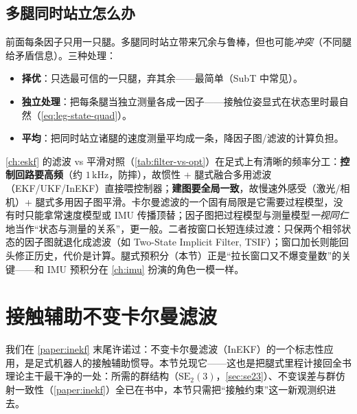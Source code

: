 \subsection{多腿同时站立怎么办}
\label{subsec:leg-multi}

前面每条因子只用一只腿。多腿同时站立带来冗余与鲁棒，但也可能\emph{冲突}（不同腿给矛盾信息）。三种处理：
\begin{itemize}
  \item \textbf{择优}：只选最可信的一只腿，弃其余\cite{carlone2026handbook}——最简单（SubT 中常见）。
  \item \textbf{独立处理}：把每条腿当独立测量各成一因子——接触位姿显式在状态里时最自然（\cref{eq:leg-state-quad}）。
  \item \textbf{平均}：把同时站立诸腿的速度测量平均成一条，降因子图/滤波的计算负担\cite{wisth2023vilens}。
\end{itemize}

\begin{insight}[滤波 vs 平滑：足式估计的频率分工]\label{ins:leg-filter-vs-smooth}
\cref{ch:eskf} 的滤波 vs 平滑对照（\cref{tab:filter-vs-opt}）在足式上有清晰的频率分工：\textbf{控制回路要高频}（约 $1\,\mathrm{kHz}$，防摔），故惯性 + 腿式融合多用滤波（EKF/UKF/InEKF）直接喂控制器；\textbf{建图要全局一致}，故慢速外感受（激光/相机）+ 腿式多用因子图平滑。卡尔曼滤波的一个固有局限是它需要过程模型，没有时只能拿常速度模型或 IMU 传播顶替；因子图把过程模型与测量模型\emph{一视同仁}地当作“状态与测量的关系”，更一般。二者按窗口长短连续过渡：只保两个相邻状态的因子图就退化成滤波（如 Two-State Implicit Filter, TSIF\cite{bloesch2013state}）；窗口加长则能回头修正历史，代价是计算。腿式预积分（本节）正是“拉长窗口又不爆变量数”的关键——和 IMU 预积分在 \cref{ch:imu} 扮演的角色一模一样。
\end{insight}

\section{接触辅助不变卡尔曼滤波}
\label{sec:leg-inekf}

我们在 \cref{paper:inekf} 末尾许诺过：不变卡尔曼滤波（InEKF）的一个标志性应用，是足式机器人的接触辅助惯导。本节兑现它——这也是把腿式里程计接回全书理论主干最干净的一处：所需的群结构（$\mathrm{SE}_2(3)$，\cref{sec:se23}）、不变误差与群仿射一致性（\cref{paper:inekf}）全已在书中，本节只需把“接触约束”这一新观测织进去。

